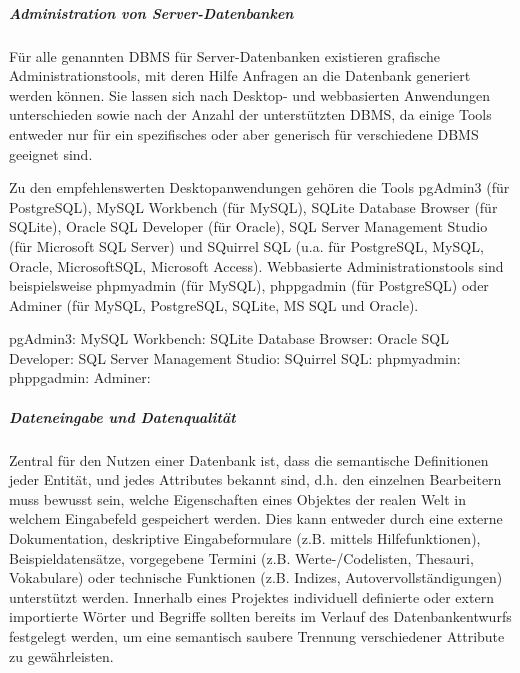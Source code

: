 \subparagraph{Administration von Server-Datenbanken}
Für alle genannten DBMS für Server-Datenbanken existieren grafische Administrationstools, mit deren Hilfe Anfragen an die Datenbank generiert werden können. Sie lassen sich nach Desktop- und webbasierten Anwendungen unterschieden sowie nach der Anzahl der unterstützten DBMS, da einige Tools entweder nur für ein spezifisches oder aber generisch für verschiedene DBMS geeignet sind.

Zu den empfehlenswerten Desktopanwendungen gehören die Tools pgAdmin3 (für PostgreSQL), MySQL Workbench (für MySQL), SQLite Database Browser (für SQLite), Oracle SQL Developer (für Oracle), SQL Server Management Studio (für Microsoft SQL Server) und SQuirrel SQL (u.a. für PostgreSQL, MySQL, Oracle, MicrosoftSQL, Microsoft Access). Webbasierte Administrationstools sind beispielsweise phpmyadmin (für MySQL), phppgadmin (für PostgreSQL) oder Adminer (für MySQL, PostgreSQL, SQLite, MS SQL und Oracle).

\begin{flushleft}
pgAdmin3: 
MySQL Workbench: 
SQLite Database Browser: 
Oracle SQL Developer: 
SQL Server Management Studio: 
SQuirrel SQL: 
phpmyadmin: 
phppgadmin: 
Adminer: 
\end{flushleft}

\subparagraph{Dateneingabe und Datenqualität}
Zentral für den Nutzen einer Datenbank ist, dass die semantische Definitionen jeder Entität, und jedes Attributes bekannt sind, d.h. den einzelnen Bearbeitern muss bewusst sein, welche Eigenschaften eines Objektes der realen Welt in welchem Eingabefeld gespeichert werden. Dies kann entweder durch eine externe Dokumentation, deskriptive Eingabeformulare (z.B. mittels Hilfefunktionen), Beispieldatensätze, vorgegebene Termini (z.B. Werte-/Codelisten, Thesauri, Vokabulare) oder technische Funktionen (z.B. Indizes, Autovervollständigungen) unterstützt werden. Innerhalb eines Projektes individuell definierte oder extern importierte Wörter und Begriffe sollten bereits im Verlauf des Datenbankentwurfs festgelegt werden, um eine semantisch saubere Trennung verschiedener Attribute zu gewährleisten.

